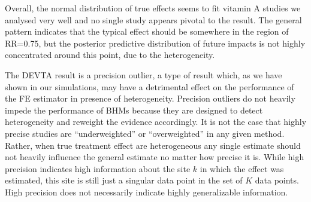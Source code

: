\documentclass[12pt]{article}
\begin{document}


Overall, the normal distribution of true effects seems to fit vitamin A studies we analysed very well and no single study appears pivotal to the result. The general pattern indicates that the typical effect should be somewhere in the region of RR=0.75, but the posterior predictive distribution of future impacts is not highly concentrated around this point, due to the heterogeneity.

The DEVTA result is a precision outlier, a type of result which, as we have shown in our simulations, may have a detrimental effect on the performance of the FE estimator in presence of heterogeneity. Precision outliers do not heavily impede the performance of BHMs because they are designed to detect heterogeneity and reweight the evidence accordingly. It is not the case that highly precise studies are ``underweighted'' or ``overweighted'' in any given method. Rather, when true treatment effect are heterogeneous any single estimate should not heavily influence the general estimate no matter how precise it is. While high precision indicates high information about the site $k$ in which the effect was estimated, this site is still just a singular data point in the set of $K$ data points. High precision does not necessarily indicate highly generalizable information. 
\end{document}
